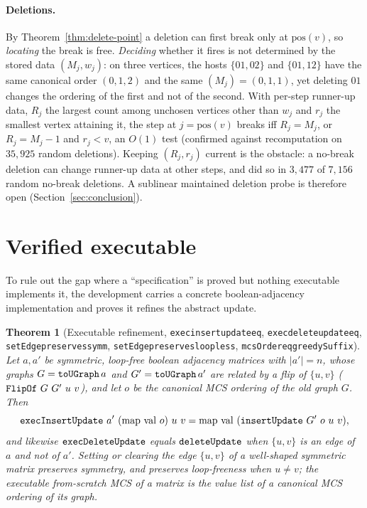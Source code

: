 \documentclass[11pt]{article}
\newtheorem{theorem}{Theorem}
\theoremstyle{definition}
\theoremstyle{remark}
\newcommand{\leanname}[1]{%
  \texttt{\begingroup\def\_{\textunderscore\allowbreak}#1\endgroup}}
\begin{document}
\paragraph{Deletions.} By Theorem~\ref{thm:delete-point} a deletion can first
break only at $\mathrm{pos}(v)$, so \emph{locating} the break is free.
\emph{Deciding} whether it fires is not determined by the stored data
$(M_j,w_j)$: on three vertices, the hosts $\{01,02\}$ and $\{01,12\}$ have the
same canonical order $(0,1,2)$ and the same $(M_j)=(0,1,1)$, yet deleting $01$
changes the ordering of the first and not of the second. With per-step
runner-up data, $R_j$ the largest count among unchosen vertices other than
$w_j$ and $r_j$ the smallest vertex attaining it, the step at
$j=\mathrm{pos}(v)$ breaks iff $R_j=M_j$, or $R_j=M_j-1$ and $r_j<v$, an $O(1)$
test (confirmed against recomputation on $35{,}925$ random deletions). Keeping
$(R_j,r_j)$ current is the obstacle: a no-break deletion can change runner-up
data at other steps, and did so in $3{,}477$ of $7{,}156$ random no-break
deletions. A sublinear maintained deletion probe is therefore open
(Section~\ref{sec:conclusion}).

\section{Verified executable}
\label{sec:exec}

To rule out the gap where a ``specification'' is proved but nothing executable
implements it, the development carries a concrete boolean-adjacency
implementation and proves it refines the abstract update.

\begin{theorem}[Executable refinement, \leanname{exec\_insert\_update\_eq}, \leanname{exec\_delete\_update\_eq}, \leanname{setEdge\_preserves\_symm}, \leanname{setEdge\_preserves\_loopless}, \leanname{mcsOrder\_eq\_greedySuffix}]
\label{thm:exec-refine}
Let $a,a'$ be symmetric, loop-free boolean adjacency matrices with $|a'|=n$,
whose graphs $G=\leanname{toUGraph}\,a$ and $G'=\leanname{toUGraph}\,a'$ are
related by a flip of $\{u,v\}$ ($\leanname{FlipOf}\ G\ G'\ u\ v$), and let $o$ be
the canonical MCS ordering of the \emph{old} graph $G$. Then
\[
\text{\leanname{execInsertUpdate}}\ a'\ (\mathrm{map\ val}\ o)\ u\ v
  = \mathrm{map\ val}\ (\text{\leanname{insertUpdate}}\ G'\ o\ u\ v),
\]
and likewise $\leanname{execDeleteUpdate}$ equals $\leanname{deleteUpdate}$ when
$\{u,v\}$ is an edge of $a$ and not of $a'$. Setting or clearing the edge
$\{u,v\}$ of a well-shaped symmetric matrix preserves symmetry, and preserves
loop-freeness when $u\neq v$;
the executable from-scratch MCS of a matrix is the value list of a canonical MCS
ordering of its graph.
\end{theorem}
\end{document}
